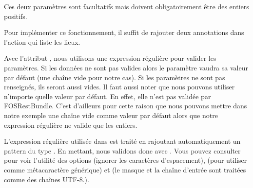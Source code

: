 \documentclass[big]{zmdocument}
\begin{document}
Ces deux paramètres sont facultatifs mais doivent obligatoirement être des entiers positifs.



Pour implémenter ce fonctionnement, il suffit de rajouter deux annotations  dans l'action qui liste les lieux.






Avec l'attribut , nous utilisons une expression régulière pour valider les paramètres. Si les données ne sont pas valides alors le paramètre vaudra sa valeur par défaut (une chaîne vide pour notre cas). Si les paramètres ne sont pas renseignés, ils seront aussi vides.
Il faut aussi noter que nous pouvons utiliser n'importe quelle valeur par défaut. En effet, elle n'est pas validée par FOSRestBundle. C'est d'ailleurs pour cette raison que nous pouvons mettre dans notre exemple une chaîne vide comme valeur par défaut alors que notre expression régulière ne valide que les entiers.



\begin{Error}
L'expression régulière utilisée dans  est traité en rajoutant automatiquement un pattern du type . En mettant,  nous validons donc avec .  Vous pouvez consulter  pour voir l'utilité des options  (ignorer les caractères d'espacement),  (pour utiliser  comme métacaractère générique) et  (le masque et la chaîne d'entrée sont traitées comme des chaînes UTF-8.).
\end{Error}
\end{document}
